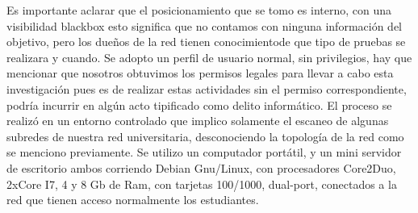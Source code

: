 \documentclass[jou,apacite]{apa6}
\begin{document}
Es importante aclarar que el posicionamiento que se tomo es  interno, con una visibilidad blackbox esto significa que no contamos con ninguna información del objetivo, pero los dueños de la red tienen conocimientode que tipo de pruebas se realizara y cuando. Se adopto un perfil de usuario normal, sin privilegios, hay que mencionar que nosotros obtuvimos los permisos legales para  llevar a cabo esta investigación pues es de realizar estas actividades sin el permiso correspondiente,  podría incurrir en algún acto tipificado como delito informático. El proceso se realizó en un entorno controlado\cite{Jason} que implico solamente el escaneo de  algunas subredes de nuestra red universitaria, desconociendo la topología de la red como se menciono previamente. Se utilizo un computador portátil, y un mini servidor de escritorio ambos corriendo Debian Gnu/Linux, con procesadores Core2Duo, 2xCore I7,  4 y 8 Gb  de Ram, con tarjetas 100/1000, dual-port, conectados a la red que tienen acceso normalmente los estudiantes.
\end{document}

